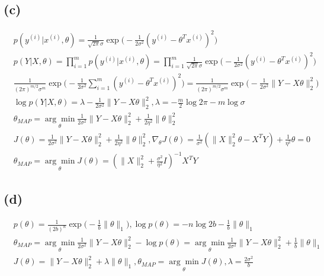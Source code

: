 \documentclass{article}
\begin{document}
\subsection*{(c)}
\begin{align*}
    & p(y^{(i)}|x^{(i)},\theta)=\frac{1}{\sqrt{2\pi}\sigma}\exp\Big(-\frac{1}{2\sigma^{2}}(y^{(i)}-\theta^{T}x^{(i)})^{2}\Big)                                                                                    \\
    & p(Y|X,\theta)=\prod_{i=1}^{m}p(y^{(i)}|x^{(i)},\theta)=\prod_{i=1}^{m}\frac{1}{\sqrt{2\pi}\sigma}\exp\Big(-\frac{1}{2\sigma^{2}}(y^{(i)}-\theta^{T}x^{(i)})^{2}\Big)                                        \\
    & \frac{1}{(2\pi)^{m/2}\sigma^{m}}\exp\Big(-\frac{1}{2\sigma^{2}}\sum_{i=1}^{m}(y^{(i)}-\theta^{T}x^{(i)})^{2}\Big)=\frac{1}{(2\pi)^{m/2}\sigma^{m}}\exp\Big(-\frac{1}{2\sigma^{2}}\|Y-X\theta\|_{2}^{2}\Big) \\
    & \log p(Y|X,\theta)=\lambda-\frac{1}{2\sigma^{2}}\|Y-X\theta\|_{2}^{2},\lambda=-\frac{m}{2}\log2\pi-m\log\sigma                                                                                              \\
    & \theta_{MAP}=\underset{\theta}{\arg\min}\frac{1}{2\sigma^{2}}\|Y-X\theta\|_{2}^{2}+\frac{1}{2\eta^{2}}\|\theta\|_{2}^{2}                                                                                    \\
    & J(\theta)=\frac{1}{2\sigma^{2}}\|Y-X\theta\|_{2}^{2}+\frac{1}{2\eta^{2}}\|\theta\|_{2}^{2},\nabla_{\theta}J(\theta)=\frac{1}{\sigma^{2}}(\|X\|_{2}^{2}\theta-X^{T}Y)+\frac{1}{\eta^{2}}\theta=0             \\
    & \theta_{MAP}=\underset{\theta}{\arg\min}J(\theta)=(\|X\|_{2}^{2}+\frac{\sigma^{2}}{\eta^{2}}I)^{-1}X^{T}Y
\end{align*}
\subsection*{(d)}
\begin{align*}
    & p(\theta)=\frac{1}{(2b)^{n}}\exp\Big(-\frac{1}{b}\|\theta\|_{1}\Big),\log p(\theta)=-n\log2b-\frac{1}{b}\|\theta\|_{1}                                                                            \\
    & \theta_{MAP}=\underset{\theta}{\arg\min}\frac{1}{2\sigma^{2}}\|Y-X\theta\|_{2}^{2}-\log p(\theta)=\underset{\theta}{\arg\min}\frac{1}{2\sigma^{2}}\|Y-X\theta\|_{2}^{2}+\frac{1}{b}\|\theta\|_{1} \\
    & J(\theta)=\|Y-X\theta\|_{2}^{2}+\lambda\|\theta\|_{1},\theta_{MAP}=\underset{\theta}{\arg\min}J(\theta),\lambda=\frac{2\sigma^{2}}{b}
\end{align*}
\end{document}
